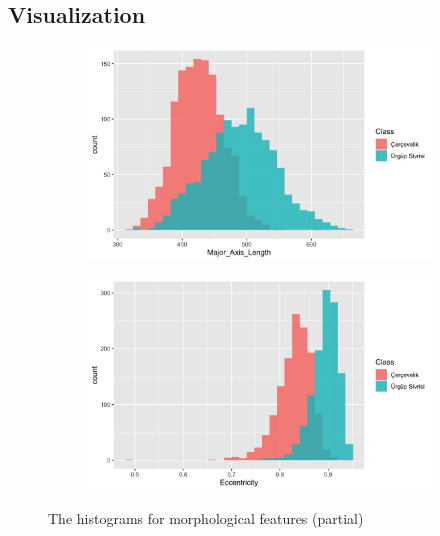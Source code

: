 \documentclass[12pt]{article}
\begin{document}
\subsection{Visualization}

\begin{figure}[ht]
    \centering
    \begin{subfigure}[b]{0.45\textwidth}
        \centering
        \includegraphics[width=\linewidth]{figures/EDA_1.png}
        \label{fig:1a}
    \end{subfigure}
    \hfill
    \begin{subfigure}[b]{0.45\textwidth}
        \centering
        \includegraphics[width=\linewidth]{figures/EDA_2.png}
        \label{fig:1b}
    \end{subfigure}
    
    \caption{The histograms for morphological features (partial)}
    \label{fig:eda}
\end{figure}
\end{document}
